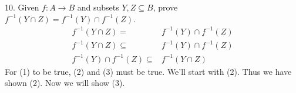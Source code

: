 \documentclass{article}
\begin{document}
\begin{exercise}{}{}
	{10. Given $f: A \rightarrow B$ and subsets $Y, Z \subseteq B$, prove
		$f^{-1}(Y \cap Z)=f^{-1}(Y) \cap f^{-1}(Z)$.}
	\setcounter{equation}{0}
	\begin{align}
		f^{-1}(Y \cap Z)=                  & f^{-1}(Y) \cap f^{-1}(Z) \\
		f^{-1}(Y \cap Z)\subseteq          & f^{-1}(Y) \cap f^{-1}(Z) \\
		f^{-1}(Y) \cap f^{-1}(Z) \subseteq & f^{-1}(Y \cap Z)
	\end{align}
	For (1) to be true, (2) and (3) must be true. We'll start with (2).
	Thus we have shown (2). Now we will show (3).


\end{exercise}
\end{document}
